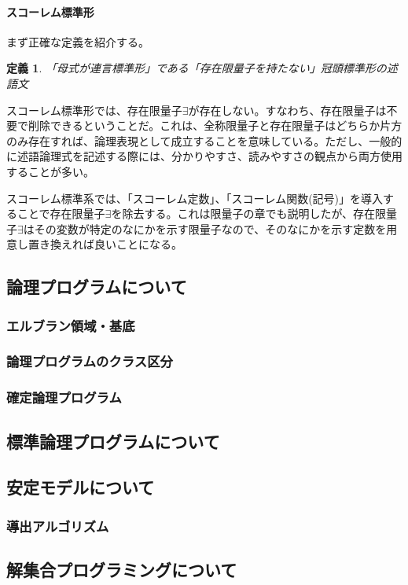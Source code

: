 \documentclass[dvipdfmx]{jsarticle}
\newtheorem{dfn}{定義}
\begin{document}
\paragraph{スコーレム標準形}
まず正確な定義を紹介する。
\begin{dfn}
  「母式が連言標準形」である「存在限量子を持たない」冠頭標準形の述語文
\end{dfn}
スコーレム標準形では、存在限量子$\exists$が存在しない。すなわち、存在限量子は不要で削除できるということだ。これは、全称限量子と存在限量子はどちらか片方のみ存在すれば、論理表現として成立することを意味している。ただし、一般的に述語論理式を記述する際には、分かりやすさ、読みやすさの観点から両方使用することが多い。\par
スコーレム標準系では、「スコーレム定数」、「スコーレム関数(記号)」を導入することで存在限量子$\exists$を除去する。これは限量子の章でも説明したが、存在限量子$\exists$はその変数が特定のなにかを示す限量子なので、そのなにかを示す定数を用意し置き換えれば良いことになる。

\subsection{論理プログラムについて}
  \subsubsection{エルブラン領域・基底}
  \subsubsection{論理プログラムのクラス区分}
  \subsubsection{確定論理プログラム}
\subsection{標準論理プログラムについて}
\subsection{安定モデルについて}
  \subsubsection{導出アルゴリズム}
\subsection{解集合プログラミングについて}
\end{document}
